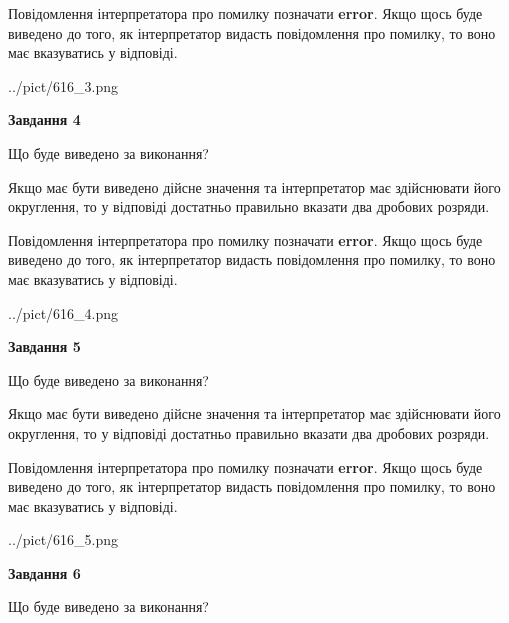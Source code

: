 \documentclass[12pt, ukrainian]{article}
\begin{document}
{\begin {Large}
Повідомлення інтерпретатора про помилку позначати \textbf{error}.
Якщо щось буде виведено до того, як інтерпретатор видасть повідомлення про помилку, 
то воно має вказуватись у відповіді. \par

\begin{center}
	{../pict/616_3.png}
\end{center}
\newpage

{\begin {center}\textbf{Завдання 4}\end {center}}\par
Що буде виведено за виконання? \par

Якщо має бути виведено дійсне значення та інтерпретатор має здійснювати його округлення, 
то у відповіді достатньо правильно вказати два дробових розряди.

Повідомлення інтерпретатора про помилку позначати \textbf{error}.
Якщо щось буде виведено до того, як інтерпретатор видасть повідомлення про помилку, 
то воно має вказуватись у відповіді. \par

\begin{center}
	{../pict/616_4.png}
\end{center}
\newpage

{\begin {center}\textbf{Завдання 5}\end {center}}\par
Що буде виведено за виконання? \par

Якщо має бути виведено дійсне значення та інтерпретатор має здійснювати його округлення, 
то у відповіді достатньо правильно вказати два дробових розряди.

Повідомлення інтерпретатора про помилку позначати \textbf{error}.
Якщо щось буде виведено до того, як інтерпретатор видасть повідомлення про помилку, 
то воно має вказуватись у відповіді. \par

\begin{center}
	{../pict/616_5.png}
\end{center}
\newpage

{\begin {center}\textbf{Завдання 6}\end {center}}\par
Що буде виведено за виконання? \par


\end{Large}}
\end{document}
